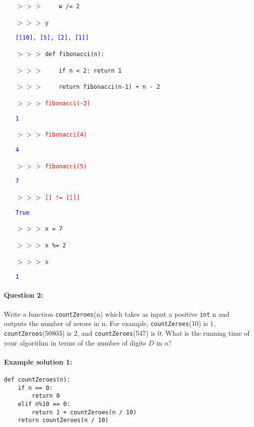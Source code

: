 \documentclass[11pt]{article}
\newcommand{\ans}[1]{\textcolor{red}{#1}}
\newcommand{\sol}[1]{\textcolor{blue}{#1}}
\begin{document}
\begin{itemize}
\item[$>>>$] \ \ \ \ \texttt{w /= 2}
\item[$>>>$] \ans{\texttt{y}}
\item[] \sol{\texttt{[[10], [5], [2], [1]]}}
\item[$>>>$] \texttt{def fibonacci(n):}
\item[$>>>$] \ \ \ \ \texttt{if n < 2: return 1}
\item[$>>>$] \ \ \ \ \texttt{return fibonacci(n-1) + n - 2}
\item[$>>>$]\ans{\texttt{fibonacci(-2)}}
\item[] \sol{\texttt{1}}
\item[$>>>$]\ans{\texttt{fibonacci(4)}}
\item[] \sol{\texttt{4}}
\item[$>>>$]\ans{\texttt{fibonacci(5)}}
\item[] \sol{\texttt{7}}
\item[$>>>$]\ans{\texttt{[] != [[]]}}
\item[] \sol{\texttt{True}}
\item[$>>>$]\texttt{x = 7}
\item[$>>>$]\texttt{x \%= 2}
\item[$>>>$]\ans{\texttt{x}}
\item[] \sol{\texttt{1}}
\end{itemize}

\newpage

\paragraph{Question 2:}
Write a function \texttt{countZeroes}(n) which takes as input a
positive
\texttt{int} n and outputs the number of zeroes in n.  For example,
\texttt{countZeroes}(10) is $1$, \texttt{countZeroes}(50803) is $2$,
and \texttt{countZeroes}(547) is $0$. What is the running time of
your algorithm in terms of the number of digits $D$ in $n$?

\paragraph{Example solution 1:}
\begin{verbatim}
def countZeroes(n):
    if n == 0: 
        return 0
    elif n%10 == 0:
        return 1 + countZeroes(n / 10)
    return countZeroes(n / 10)
\end{verbatim}
\end{document}
